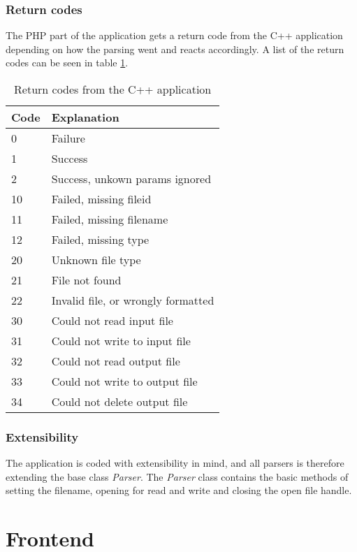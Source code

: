 \subsubsection{Return codes}
The PHP part of the application gets a return code from the C++ application depending on how the parsing went and reacts accordingly. A list of the return codes can be seen in table \ref{tab:cppReturnCodes}.
\begin{table}[htbp]
\centering
\begin{tabular}{|l|l|}
\hline
\textbf{Code} & \textbf{Explanation}\\
\hline
0 & Failure\\
\hline
1 & Success\\
\hline
2 & Success, unkown params ignored\\
\hline
10 & Failed, missing fileid\\
\hline
11 & Failed, missing filename\\
\hline
12 & Failed, missing type\\
\hline
20 & Unknown file type\\
\hline
21 & File not found\\
\hline
22 & Invalid file, or wrongly formatted\\
\hline
30 & Could not read input file\\
\hline
31 & Could not write to input file\\
\hline
32 & Could not read output file\\
\hline
33 & Could not write to output file\\
\hline
34 & Could not delete output file\\
\hline
\end{tabular}
\caption{Return codes from the C++ application}
\label{tab:cppReturnCodes}
\end{table}

\subsubsection{Extensibility}
The application is coded with extensibility in mind, and all parsers is therefore extending the base class \emph{Parser}.
The \emph{Parser} class contains the basic methods of setting the filename, opening for read and write and closing the open file handle.



\section{Frontend}
